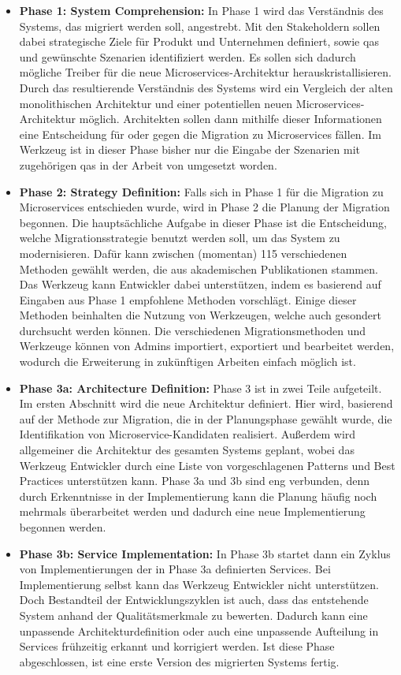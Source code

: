 \begin{itemize}
	\item \textbf{Phase 1: System Comprehension:}
	In Phase 1 wird das Verständnis des Systems, das migriert werden soll, angestrebt.
	Mit den Stakeholdern sollen dabei strategische Ziele für Produkt und Unternehmen definiert, sowie \glspl{qa} und gewünschte Szenarien identifiziert werden.
	Es sollen sich dadurch mögliche Treiber für die neue Microservices-Architektur herauskristallisieren.
	Durch das resultierende Verständnis des Systems wird ein Vergleich der alten monolithischen Architektur und einer potentiellen neuen Microservices-Architektur möglich.
	Architekten sollen dann mithilfe dieser Informationen eine Entscheidung für oder gegen die Migration zu Microservices fällen.
	Im Werkzeug ist in dieser Phase bisher nur die Eingabe der Szenarien mit zugehörigen \glspl{qa} in der Arbeit von  umgesetzt worden.
	\item \textbf{Phase 2: Strategy Definition:}
	Falls sich in Phase 1 für die Migration zu Microservices entschieden wurde, wird in Phase 2 die Planung der Migration begonnen.
	Die hauptsächliche Aufgabe in dieser Phase ist die Entscheidung, welche Migrationsstrategie benutzt werden soll, um das System zu modernisieren.
	Dafür kann zwischen (momentan) 115 verschiedenen Methoden gewählt werden, die aus akademischen Publikationen stammen.
	Das Werkzeug kann Entwickler dabei unterstützen, indem es basierend auf Eingaben aus Phase 1 empfohlene Methoden vorschlägt.
	Einige dieser Methoden beinhalten die Nutzung von Werkzeugen, welche auch gesondert durchsucht werden können.
	Die verschiedenen Migrationsmethoden und Werkzeuge können von Admins importiert, exportiert und bearbeitet werden, wodurch die Erweiterung in zukünftigen Arbeiten einfach möglich ist.
	\item \textbf{Phase 3a: Architecture Definition:}
	Phase 3 ist in zwei Teile aufgeteilt.
	Im ersten Abschnitt wird die neue Architektur definiert.
	Hier wird, basierend auf der Methode zur Migration, die in der Planungsphase gewählt wurde, die Identifikation von Microservice-Kandidaten realisiert.
	Außerdem wird allgemeiner die Architektur des gesamten Systems geplant, wobei das Werkzeug Entwickler durch eine Liste von vorgeschlagenen Patterns und Best Practices unterstützen kann.
	 Phase 3a und 3b sind eng verbunden, denn durch Erkenntnisse in der Implementierung kann die Planung häufig noch mehrmals überarbeitet werden und dadurch eine neue Implementierung begonnen werden.
	\item \textbf{Phase 3b: Service Implementation:} In Phase 3b startet dann ein Zyklus von Implementierungen der in Phase 3a definierten Services.
	Bei Implementierung selbst kann das Werkzeug Entwickler nicht unterstützen.
	Doch Bestandteil der Entwicklungszyklen ist auch, dass das entstehende System anhand der Qualitätsmerkmale zu bewerten.
	Dadurch kann eine unpassende Architekturdefinition oder auch eine unpassende Aufteilung in Services frühzeitig erkannt und korrigiert werden.
	Ist diese Phase abgeschlossen, ist eine erste Version des migrierten Systems fertig.
\end{itemize}

